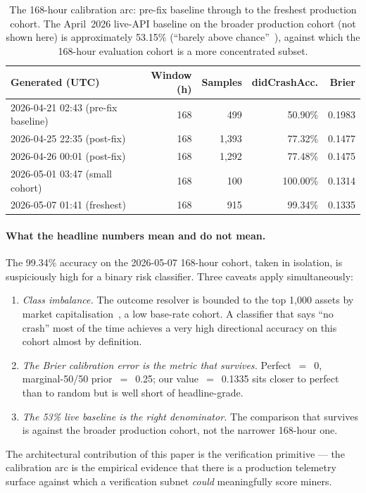\documentclass[11pt,a4paper]{article}
\begin{document}
\begin{table}[ht]
\centering
\small
\begin{tabular}{lrrrr}
\toprule
\textbf{Generated (UTC)} & \textbf{Window (h)} & \textbf{Samples} &
\textbf{didCrashAcc.} & \textbf{Brier} \\
\midrule
2026-04-21 02:43 (pre-fix baseline)   & 168 &  499 & 50.90\% & 0.1983 \\
2026-04-25 22:35 (post-fix)           & 168 & 1{,}393 & 77.32\% & 0.1477 \\
2026-04-26 00:01 (post-fix)           & 168 & 1{,}292 & 77.48\% & 0.1475 \\
2026-05-01 03:47 (small cohort)       & 168 &  100 & 100.00\% & 0.1314 \\
2026-05-07 01:41 (freshest)           & 168 &  915 & 99.34\% & 0.1335 \\
\bottomrule
\end{tabular}
\caption{The 168-hour calibration arc: pre-fix baseline through to the
freshest production cohort. The April~2026 live-API baseline on the
broader production cohort (not shown here) is approximately 53.15\%
(``barely above
chance''~\cite{omnirisk2026systemdesign}), against which the 168-hour
evaluation cohort is a more concentrated subset.}
\label{tab:calibration-arc}
\end{table}

\paragraph{What the headline numbers mean and do not mean.} The
99.34\% accuracy on the 2026-05-07 168-hour cohort, taken in isolation,
is suspiciously high for a binary risk classifier. Three caveats apply
simultaneously:
\begin{enumerate}
  \item \emph{Class imbalance.} The outcome resolver is bounded to the
        top 1{,}000 assets by market capitalisation~\cite{omnirisk2026systemdesign},
        a low base-rate cohort. A classifier that says ``no crash'' most
        of the time achieves a very high directional accuracy on this
        cohort almost by definition.
  \item \emph{The Brier calibration error is the metric that survives.}
        Perfect~$=$~0, marginal-50/50 prior~$=$~0.25; our
        value~$=$~0.1335 sits closer to perfect than to random but is
        well short of headline-grade.
  \item \emph{The 53\% live baseline is the right denominator.} The
        comparison that survives is against the broader production
        cohort, not the narrower 168-hour one.
\end{enumerate}
The architectural contribution of this paper is the verification
primitive --- the calibration arc is the empirical evidence that there
is a production telemetry surface against which a verification subnet
\emph{could} meaningfully score miners.
\end{document}
